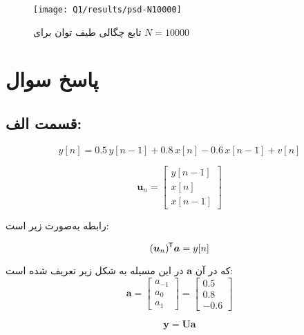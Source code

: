 \documentclass[12pt,onecolumn,a4paper]{article}
\newcommand*{\transpose}{{\mkern-1.5mu\mathsf{T}}}
\newcommand\question{
	\section{پاسخ سوال \tartibi{section}}
}
\begin{document}
		\begin{figure}[H]
			\centering
			\texttt{[image: Q1/results/psd-N10000]}
			\caption{تابع چگالی طیف توان برای \( N = 10000 \)}
			\label{fig:psd-n10000}
		\end{figure}
		





		\FloatBarrier
		\question%
		
		\FloatBarrier
		\subsection{قسمت الف:}



\begin{equation}
	y[n] = 0.5 \, y[n-1] + 0.8 \, x[n] - 0.6 \, x[n-1] + v[n]
\end{equation}


\begin{equation}
	\bm{u}_n = \begin{bmatrix}
		y[n-1] \\
		x[n] \\
		x[n-1]
	\end{bmatrix}
\end{equation}


رابطه به‌صورت زیر است:

\begin{equation}
	(\bm{u}_n)^\transpose \bm{a}
	= y[n]
\end{equation}

که در آن $\bm{a}$ در این مسیله به شکل زیر تعریف شده است:
\begin{equation}
	\bm{a} = 
	\begin{bmatrix}
		a_{-1} \\
		a_{0} \\
		a_{1}
	\end{bmatrix} =
	\begin{bmatrix}
		0.5 \\
		0.8 \\
		-0.6
	\end{bmatrix}
\end{equation}

	
\begin{equation}
	\bm{y} = \bm{U} \bm{a}
\end{equation}
\end{document}

